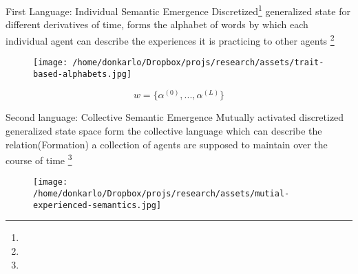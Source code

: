 \documentclass[unknownkeysallowed]{beamer}
\begin{document}
	\begin{frame}{First Language: Individual Semantic Emergence}
		Discretized\footnote{} generalized state for different derivatives of time, forms the alphabet of words by which each individual agent can describe the experiences it is practicing to other agents \footnote{}
		\begin{figure}
			\texttt{[image: /home/donkarlo/Dropbox/projs/research/assets/trait-based-alphabets.jpg]}
			\caption{}
		\end{figure}
		\begin{equation}
			w = \{\alpha^{(0)},...,\alpha^{(L)}\}
		\end{equation}
	\end{frame}

	\begin{frame}{Second language: Collective Semantic Emergence}
		Mutually activated discretized generalized state space form the collective language which can describe the relation(Formation) a collection of agents are supposed to maintain over the course of time \footnote{}
		\begin{figure}
			\texttt{[image: /home/donkarlo/Dropbox/projs/research/assets/mutial-experienced-semantics.jpg]}
			\caption{}
		\end{figure}
	\end{frame}
\end{document}
